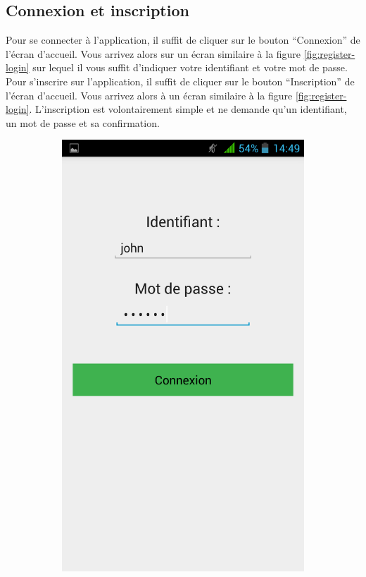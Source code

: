 \subsection{Connexion et inscription}
Pour se connecter à l'application, il suffit de cliquer
sur le bouton ``Connexion'' de l'écran d'accueil. Vous
arrivez alors sur un écran similaire à la figure \ref{fig:register-login}
sur lequel il vous suffit d'indiquer votre identifiant et votre
mot de passe. Pour s'inscrire sur l'application, il suffit de cliquer
sur le bouton ``Inscription'' de l'écran d'accueil. Vous arrivez alors à un écran similaire à la figure \ref{fig:register-login}. L'inscription
est volontairement simple et ne demande qu'un identifiant, un mot
de passe et sa confirmation. 

\begin{figure}[H]
    \centering
    \begin{subfigure}
				\centering
				\includegraphics[scale=0.15]{img/login.png}

\end{subfigure}
\end{figure}
